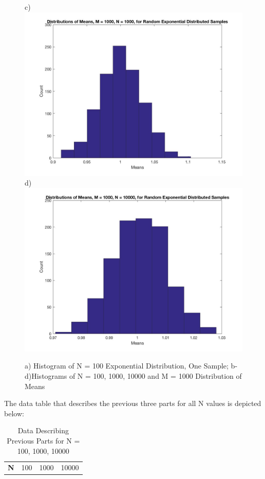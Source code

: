 \documentclass{article}
\begin{document}
\begin{enumerate}
\begin{figure}[H]
    c)\includegraphics[scale = 0.2]{4c.jpg}
    d)\includegraphics[scale = 0.2]{4d.jpg}
    \caption{a) Histogram of N = 100 Exponential Distribution, One Sample; b-d)Histograms of N = 100, 1000, 10000 and M = 1000 Distribution of Means}
    \label{fig:my_label}
\end{figure}
            The data table that describes the previous three parts for all N values is depicted below:
            \begin{table}[H]
                \centering
                \caption{Data Describing Previous Parts for N = 100, 1000, 10000}
                \label{my-label}
                \begin{tabular}{llll}
                \textbf{N} & 100 & 1000 & 10000 \\

\end{tabular}
\end{table}
\end{enumerate}
\end{document}
